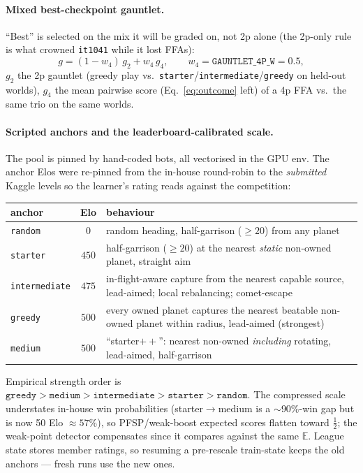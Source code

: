 \documentclass[11pt]{article}
\newcommand{\E}{\mathbb{E}}
\newcommand{\cd}[1]{\texttt{#1}}
\begin{document}
\paragraph{Mixed best-checkpoint gauntlet.} ``Best'' is selected on the mix it will be graded on, not 2p
alone (the 2p-only rule is what crowned \cd{it1041} while it lost FFAs):
\begin{equation}
g=(1-w_4)\,g_2+w_4\,g_4,\qquad w_4=\cd{GAUNTLET\_4P\_W}=0.5,
\end{equation}
$g_2$ the 2p gauntlet (greedy play vs.\ \cd{starter}/\cd{intermediate}/\cd{greedy} on held-out worlds),
$g_4$ the mean pairwise score (Eq.~\eqref{eq:outcome} left) of a 4p FFA vs.\ the same trio on the same
worlds.

\paragraph{Scripted anchors and the leaderboard-calibrated scale.} The pool is pinned by hand-coded bots,
all vectorised in the GPU env. The anchor Elos were re-pinned from the in-house round-robin to the
\emph{submitted} Kaggle levels so the learner's rating reads against the competition:
\begin{center}\small
\begin{tabular}{@{}lcl@{}}
\toprule
anchor & Elo & behaviour \\
\midrule
\cd{random}       & $0$   & random heading, half-garrison ($\ge20$) from any planet \\
\cd{starter}      & $450$ & half-garrison ($\ge20$) at the nearest \emph{static} non-owned planet, straight aim \\
\cd{intermediate} & $475$ & in-flight-aware capture from the nearest capable source, lead-aimed; local rebalancing; comet-escape \\
\cd{greedy}       & $500$ & every owned planet captures the nearest beatable non-owned planet within radius, lead-aimed (strongest) \\
\cd{medium}       & $500$ & ``starter$++$'': nearest non-owned \emph{including} rotating, lead-aimed, half-garrison \\
\bottomrule
\end{tabular}
\end{center}
Empirical strength order is
$\cd{greedy}>\cd{medium}>\cd{intermediate}>\cd{starter}>\cd{random}$. The compressed scale understates
in-house win probabilities (starter$\to$medium is a $\sim$90\%-win gap but is now 50 Elo $\approx57\%$),
so PFSP/weak-boost expected scores flatten toward $\tfrac12$; the weak-point detector compensates since it
compares against the same $\E$. League state stores member ratings, so resuming a pre-rescale train-state
keeps the old anchors --- fresh runs use the new ones.
\end{document}
